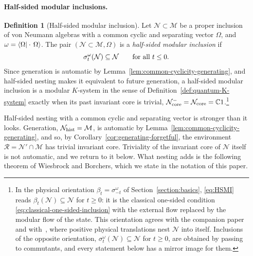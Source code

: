 \documentclass[a4paper,11pt]{article}
\theoremstyle{definition}
\newtheorem{definition}{Definition}[section]
\newcommand{\mR}{\mathcal{R}}
\newcommand{\mN}{\mathcal{N}}
\newcommand{\mM}{\mathcal{M}}
\begin{document}
\paragraph{Half-sided modular inclusions.}
\begin{definition}[Half-sided modular inclusion]\label{def:modular-K}\label{def:HSMI}
Let $\mN\subset\mM$ be a proper inclusion of von Neumann algebras with a common cyclic and separating vector $\Omega$, and $\omega=\braket{\Omega|\cdot\,\Omega}$. The pair $(\mN\subset\mM,\Omega)$ is a \emph{half-sided modular inclusion} if
\begin{equation}
 \sigma^{\omega}_t(\mN)\subseteq\mN\qquad\hbox{for all } t\le0 .
 \label{eq:HSMI}
\end{equation}
Since generation is automatic by Lemma~\ref{lem:common-cyclicity-generating}, and half-sided nesting makes it equivalent to future generation, a half-sided modular inclusion is a modular $K$-system in the sense of Definition~\ref{def:quantum-K-system} exactly when its past invariant core is trivial, $\mN_{\rm core}^{-}=\mN_{\rm core}=\mathbb C1$.\footnote{In the physical orientation $\beta_t=\sigma^\omega_{-t}$ of Section~\ref{section:basics}, \eqref{eq:HSMI} reads $\beta_t(\mN)\subseteq\mN$ for $t\ge0$: it is the classical one-sided condition \eqref{eq:classical-one-sided-inclusion} with the external flow replaced by the modular flow of the state. This orientation agrees with the companion paper and with~\cite{Wiesbrock1993,revolutionizing}, where positive physical translations nest $\mN$ into itself. Inclusions of the opposite orientation, $\sigma^\omega_t(\mN)\subseteq\mN$ for $t\ge0$, are obtained by passing to commutants, and every statement below has a mirror image for them.}
\end{definition}

Half-sided nesting with a common cyclic and separating vector is stronger than it looks. Generation, $\mN_{\rm hist}=\mM$, is automatic by Lemma~\ref{lem:common-cyclicity-generating}, and so, by Corollary~\ref{cor:generating-forgetful}, the environment $\mR=\mN'\cap\mM$ has trivial invariant core. Triviality of the invariant core of $\mN$ itself is not automatic, and we return to it below. What nesting adds is the following theorem of Wiesbrock and Borchers, which we state in the notation of this paper.
\end{document}
